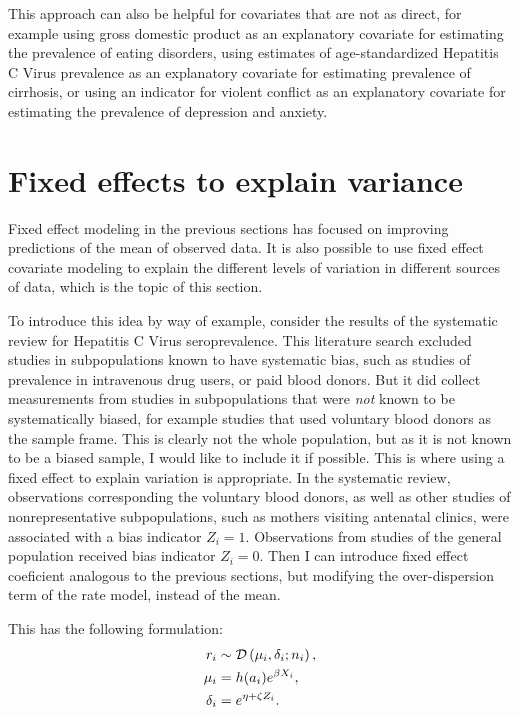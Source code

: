 This approach can also be helpful for covariates that are not as
direct, for example using gross domestic product as an explanatory
covariate for estimating the prevalence of eating disorders, using
estimates of age-standardized Hepatitis C Virus prevalence as an
explanatory covariate for estimating prevalence of cirrhosis, or using
an indicator for violent conflict as an explanatory covariate for
estimating the prevalence of depression and anxiety.



\section{Fixed effects to explain variance}
Fixed effect modeling in the previous sections has focused on
improving predictions of the mean of observed data.  It is also
possible to use fixed effect covariate modeling to explain the
different levels of variation in different sources of data, which is
the topic of this section.

To introduce this idea by way of example, consider the results of the
systematic review for Hepatitis C Virus seroprevalence.  This
literature search excluded studies in subpopulations known to have
systematic bias, such as studies of prevalence in intravenous drug
users, or paid blood donors.  But it did collect measurements from
studies in subpopulations that were \emph{not} known to be
systematically biased, for example studies that used voluntary blood
donors as the sample frame.  This is clearly not the whole population,
but as it is not known to be a biased sample, I would like to include
it if possible.  This is where using a fixed effect to explain
variation is appropriate. In the systematic review, observations corresponding
the voluntary blood donors, as well as other studies of nonrepresentative
subpopulations, such as mothers visiting antenatal clinics, were
associated with a
bias indicator $Z_i = 1$.  Observations from studies of the general
population received bias indicator $Z_i = 0$.  Then I can
introduce fixed effect coeficient analogous to the previous sections,
but modifying the over-dispersion term of the rate model, instead of
the mean.

This has the following
formulation:
\begin{align*}
r_i &\sim \mathcal{D}\left(\mu_i, \delta_i; n_i\right),\\
\mu_i &= h(a_i)e^{\beta X_i},\\
\delta_i &= e^{\eta + \zeta Z_i}.
\end{align*}

